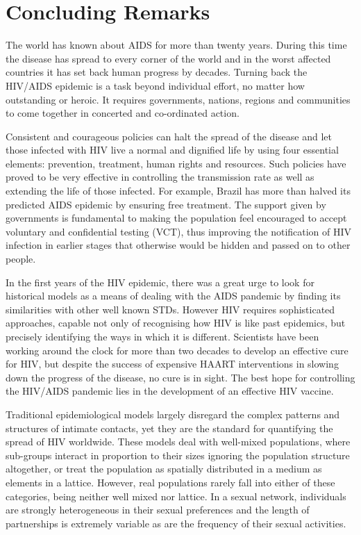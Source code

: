 \chapter{Concluding Remarks}\label{chpconclusion}

The world has known about AIDS for more than twenty years. During this time the disease
has spread to every corner of the world and in the worst affected countries it has set
back human progress by decades. Turning back the HIV/AIDS epidemic is a task beyond
individual effort, no matter how outstanding or heroic. It requires governments, nations,
regions and communities to come together in concerted and co-ordinated action.

Consistent and courageous policies can halt the spread of the disease and let those
infected with HIV live a normal and dignified life by using four essential elements:
prevention, treatment, human rights and resources. Such policies have proved to be very
effective in controlling the transmission rate as well as extending the life of those
infected. For example, Brazil has more than halved its predicted AIDS epidemic by
ensuring free treatment. The support given by governments is fundamental to making the
population feel encouraged to accept voluntary and confidential testing (VCT), thus
improving the notification of HIV infection in earlier stages that otherwise would be
hidden and passed on to other people.

In the first years of the HIV epidemic, there was a great urge to look for historical
models as a means of dealing with the AIDS pandemic by finding its similarities with
other well known STDs. However HIV requires sophisticated approaches, capable not only of
recognising how HIV is like past epidemics, but precisely identifying the ways in which
it is different. Scientists have been working around the clock for more than two decades
to develop an effective cure for HIV, but despite the success of expensive HAART
interventions in slowing down the progress of the disease, no cure is in sight. The best
hope for controlling the HIV/AIDS pandemic lies in the development of an effective HIV
vaccine.

Traditional epidemiological models largely disregard the complex patterns and structures
of intimate contacts, yet they are the standard for quantifying the spread of HIV
worldwide. These models deal with well-mixed populations, where sub-groups interact in
proportion to their sizes ignoring the population structure altogether, or treat the
population as spatially distributed in a medium as elements in a lattice. However, real
populations rarely fall into either of these categories, being neither well mixed nor
lattice. In a sexual network, individuals are strongly heterogeneous in their sexual
preferences and the length of partnerships is extremely variable as are the frequency of
their sexual activities.

